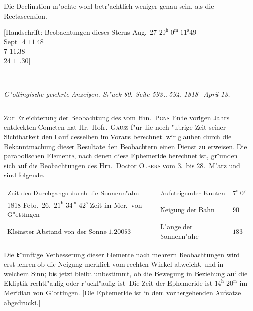 \documentclass[12pt,a4paper]{article}
\begin{document}
Die Declination m"ochte wohl betr"achtlich weniger genau sein, als die Rectascension.

\hspace{\fill}[Handschrift: Beobachtungen dieses Sterns  Aug.~27 \quad $20^{\mathrm{h}}\;0^{\mathrm{m}}\;11^{\mathrm{s}}49$\\
\null\hfill Sept.~\phantom{0}4 \quad \phantom{0}\phantom{0}\phantom{0}\phantom{0}\phantom{0}$11.48$\\
\null\hfill \phantom{0}\phantom{0}\phantom{0}\phantom{0}\phantom{0}\phantom{0}7 \quad \phantom{0}\phantom{0}\phantom{0}\phantom{0}\phantom{0}$11.38$\\
\null\hfill \phantom{0}\phantom{0}\phantom{0}\phantom{0}\phantom{0}24 \quad \phantom{0}\phantom{0}\phantom{0}\phantom{0}\phantom{0}$11.30$]

\vspace{1em}

\begin{center}
\rule{0.6\textwidth}{0.4pt}\\[0.5em]
\textit{G"ottingische gelehrte Anzeigen. St"uck 60. Seite 593\,..\,594. 1818.~April 13.}\\[0.3em]
\rule{0.6\textwidth}{0.4pt}
\end{center}

Zur Erleichterung der Beobachtung des vom Hrn.~\textsc{Pons} Ende vorigen Jahrs entdeckten Cometen
hat Hr.~Hofr.~\textsc{Gauss} f"ur die noch "ubrige Zeit seiner Sichtbarkeit den Lauf desselben im Voraus berechnet;
wir glauben durch die Bekanntmachung dieser Resultate den Beobachtern einen Dienst zu erweisen.
Die parabolischen Elemente, nach denen diese Ephemeride berechnet ist, gr"unden sich auf die Beobachtungen
des Hrn.~Doctor \textsc{Olbers} vom 3.~bis 28.~M"arz und sind folgende:

\begin{center}
\begin{tabular}{l@{\quad}l@{\quad}l}
Zeit des Durchgangs durch die Sonnenn"ahe & Aufsteigender Knoten & $7^{\circ}\;0'$ \\
1818 Febr.~26.\ $21^{\mathrm{h}}\;34^{\mathrm{m}}\;42^{\mathrm{s}}$ Zeit im Mer.~von G"ottingen & Neigung der Bahn & $90$ \\
Kleinster Abstand von der Sonne \dotfill $1.20053$ & L"ange der Sonnenn"ahe & $183$ \\
\end{tabular}
\end{center}

Die k"unftige Verbesserung dieser Elemente nach mehrern Beobachtungen wird erst lehren ob die
Neigung merklich vom rechten Winkel abweicht, und in welchem Sinn; bis jetzt bleibt unbestimmt,
ob die Bewegung in Beziehung auf die Ekliptik rechtl"aufig oder r"uckl"aufig ist. Die Zeit der Ephemeride
ist $14^{\mathrm{h}}\;20^{\mathrm{m}}$ im Meridian von G"ottingen. [Die Ephemeride ist in dem vorhergehenden Aufsatze abgedruckt.]
\end{document}
